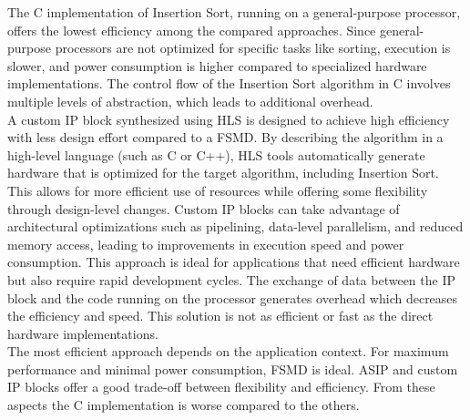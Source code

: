 \documentclass[conference]{IEEEtran}
\begin{document}
The C implementation of Insertion Sort, running on a general-purpose processor, offers the lowest efficiency among the compared approaches. Since general-purpose processors are not optimized for specific tasks like sorting, execution is slower, and power consumption is higher compared to specialized hardware implementations. The control flow of the Insertion Sort algorithm in C involves multiple levels of abstraction, which leads to additional overhead.\\
A custom IP block synthesized using HLS is designed to achieve high efficiency with less design effort compared to a FSMD. By describing the algorithm in a high-level language (such as C or C++), HLS tools automatically generate hardware that is optimized for the target algorithm, including Insertion Sort. This allows for more efficient use of resources while offering some flexibility through design-level changes. Custom IP blocks can take advantage of architectural optimizations such as pipelining, data-level parallelism, and reduced memory access, leading to improvements in execution speed and power consumption. This approach is ideal for applications that need efficient hardware but also require rapid development cycles. The exchange of data between the IP block and the code running on the processor generates overhead which decreases the efficiency and speed. This solution is not as efficient or fast as the direct hardware implementations.\\
The most efficient approach depends on the application context. For maximum performance and minimal power consumption, FSMD is ideal. ASIP and custom IP blocks offer a good trade-off between flexibility and efficiency. From these aspects the C implementation is worse compared to the others.\\
\end{document}
